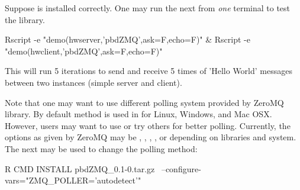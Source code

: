 Suppose  is installed correctly. One may run the next from
{\em one} terminal to test the library.
\begin{Command}
Rscript -e "demo(hwserver,'pbdZMQ',ask=F,echo=F)" &
Rscript -e "demo(hwclient,'pbdZMQ',ask=F,echo=F)"
\end{Command}
This will run 5 iterations to send and receive 5 times of
'Hello World' messages between two instances (simple server and client).

Note that one may want to use different polling system provided by 
ZeroMQ library.
By default  method is used in  for Linux, Windows, and
Mac OSX. However, users may want to use  or try others for
better polling. Currently, the options as given by ZeroMQ may be ,
, , , or  depending on
libraries and system. The next may be used to change the polling method:
\begin{Command}
R CMD INSTALL pbdZMQ_0.1-0.tar.gz \
  --configure-vars="ZMQ_POLLER='autodetect'"
\end{Command}

